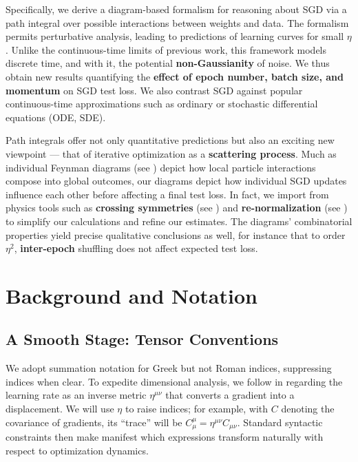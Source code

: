 \documentclass{article}
\begin{document}
    Specifically, we derive a diagram-based formalism for reasoning about SGD
    via a path integral over possible interactions between weights and data.
    The formalism permits perturbative analysis, leading to predictions of
    learning curves for small $\eta$.  Unlike the continuous-time limits of
    previous work, this framework models discrete time, and with it, the
    potential {\bf non-Gaussianity} of noise.  We thus obtain new results
    quantifying the {\bf effect of epoch number, batch size, and momentum} on
    SGD test loss.  We also contrast SGD against popular continuous-time
    approximations such as ordinary or stochastic differential equations (ODE,
    SDE).
    
    Path integrals offer not only quantitative predictions but also an exciting
    new viewpoint --- that of iterative optimization as a {\bf scattering
    process}.  Much as individual Feynman diagrams (see \citet{dy49a}) depict
    how local particle interactions compose into global outcomes, our diagrams
    depict how individual SGD updates influence each other before affecting a
    final test loss.  In fact, we import from physics tools such as {\bf
    crossing symmetries} (see \citet{dy49b}) and {\bf re-normalization} (see
    \citet{ge54}) to simplify our calculations and refine our estimates.  The
    diagrams' combinatorial properties yield precise qualitative conclusions as
    well, for instance that to order $\eta^2$, {\bf inter-epoch} shuffling does
    not affect expected test loss.



\section{Background and Notation}

\subsection{A Smooth Stage: Tensor Conventions}
    We adopt summation notation for Greek but not Roman indices, suppressing
    indices when clear.  To expedite dimensional analysis, we follow
    \cite{bo13} in regarding the learning rate as an inverse metric
    $\eta^{\mu\nu}$ that converts a gradient into a displacement.  We will use
    $\eta$ to raise indices; for example, with $C$ denoting the covariance of
    gradients, its ``trace'' will be $C^{\mu}_{\mu} = \eta^{\mu\nu}
    C_{\mu\nu}$.  Standard syntactic constraints then make manifest which
    expressions transform naturally with respect to optimization dynamics.
    
\end{document}
